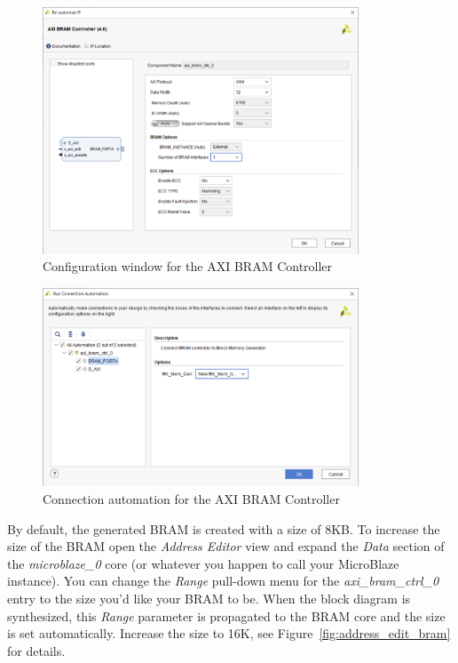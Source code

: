 \documentclass[11pt]{article}
\begin{document}
\begin{figure}[!h]
    \centering
    \includegraphics[width=0.84\textwidth]{images/bram_cntr_config.png}
    \caption{Configuration window for the AXI BRAM Controller}
    \label{fig:bram_cntr_config}
\end{figure}

\begin{figure}[!h]
    \centering
    \includegraphics[width=0.84\textwidth]{images/conn_auto_bram.png}
    \caption{Connection automation for the AXI BRAM Controller}
    \label{fig:conn_auto_bram}
\end{figure}

By default, the generated BRAM is created with a size of 8KB. To increase the size of the BRAM open the \textit{Address Editor} view and expand the \textit{Data} section of the \textit{microblaze\_0} core (or whatever you happen to call your MicroBlaze instance). You can change the \textit{Range} pull-down menu for the \textit{axi\_bram\_ctrl\_0} entry to the size you'd like your BRAM to be. When the block diagram is synthesized, this \textit{Range} parameter is propagated to the BRAM core and the size is set automatically. Increase the size to 16K, see Figure~\ref{fig:address_edit_bram} for details.
\end{document}
